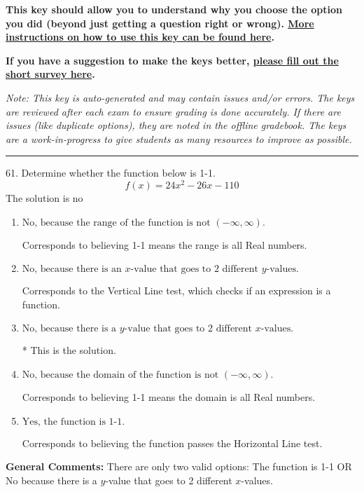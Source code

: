 \documentclass{article}[14pt]
\begin{document}
\textbf{This key should allow you to understand why you choose the option you did (beyond just getting a question right or wrong). \href{https://xronos.clas.ufl.edu/mac1105spring2020/courseDescriptionAndMisc/Exams/LearningFromResults}{More instructions on how to use this key can be found here}.}

\textbf{If you have a suggestion to make the keys better, \href{https://forms.gle/CZkbZmPbC9XALEE88}{please fill out the short survey here}.}

\textit{Note: This key is auto-generated and may contain issues and/or errors. The keys are reviewed after each exam to ensure grading is done accurately. If there are issues (like duplicate options), they are noted in the offline gradebook. The keys are a work-in-progress to give students as many resources to improve as possible.}

\rule{\textwidth}{0.4pt}

61. Determine whether the function below is 1-1.
$$ f(x) = 24 x^2 - 26 x - 110 $$ 
The solution is $ \text{no} $ 

\begin{enumerate}[label=\Alph*.] 
\item $ \text{No, because the range of the function is not $(-\infty, \infty)$.} $ 

 Corresponds to believing 1-1 means the range is all Real numbers. 
\item $ \text{No, because there is an $x$-value that goes to 2 different $y$-values.} $ 

 Corresponds to the Vertical Line test, which checks if an expression is a function. 
\item $ \text{No, because there is a $y$-value that goes to 2 different $x$-values.} $ 

 * This is the solution. 
\item $ \text{No, because the domain of the function is not $(-\infty, \infty)$.} $ 

 Corresponds to believing 1-1 means the domain is all Real numbers. 
\item $ \text{Yes, the function is 1-1.} $ 

 Corresponds to believing the function passes the Horizontal Line test. 
\end{enumerate} 
 
\textbf{General Comments:} There are only two valid options: The function is 1-1 OR No because there is a $y$-value that goes to 2 different $x$-values.
\end{document}
